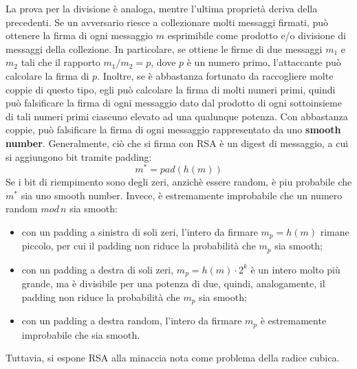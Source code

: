 La prova per la divisione è analoga, mentre l'ultima proprietà deriva della precedenti.
\newline \newline 
Se un avversario riesce a collezionare molti messaggi firmati, può ottenere la firma di ogni messaggio $m$ esprimibile come prodotto e/o divisione di messaggi della collezione. In particolare, se ottiene le firme di due messaggi $m_{1}$ e $m_{2}$ tali che il rapporto $m_{1}/m_{2}=p$, dove $p$ è un numero primo, l'attaccante può calcolare la firma di $p$. Inoltre, se è abbastanza fortunato da raccogliere molte coppie di questo tipo, egli può calcolare la firma di molti numeri primi, quindi può falsificare la firma di ogni messaggio dato dal prodotto di ogni sottoinsieme di tali numeri primi ciascuno elevato ad una qualunque potenza. Con abbastanza coppie, può falsificare la firma di ogni messaggio rappresentato da uno \textbf{smooth number}. 
\newline \newline
Generalmente, ciò che si firma con RSA è un digest di messaggio, a cui si aggiungono bit tramite padding:
\begin{equation}
m^{*} = pad(h(m))
\end{equation} 
Se i bit di riempimento sono degli zeri, anzichè essere random, è piu probabile che $m^*$ sia uno smooth number. Invece, è estremamente improbabile che un numero random $mod \, n$ sia smooth: 
\begin{itemize}
\item con un padding a sinistra di soli zeri, l'intero da firmare $m_{p} = h(m)$ rimane piccolo, per cui il padding non riduce la probabilità che $m_{p}$ sia smooth;
\item con un padding a destra di soli zeri, $m_{p} = h(m) \cdot 2^k $ è un intero molto più grande, ma è divisibile per una potenza di due, quindi, analogamente, il padding non riduce la probabilità che $m_{p}$ sia smooth;
\item con un padding a destra random, l'intero da firmare $m_{p}$ è estremamente improbabile che sia smooth. 
\end{itemize}
Tuttavia, si espone RSA alla minaccia nota come problema della radice cubica.

